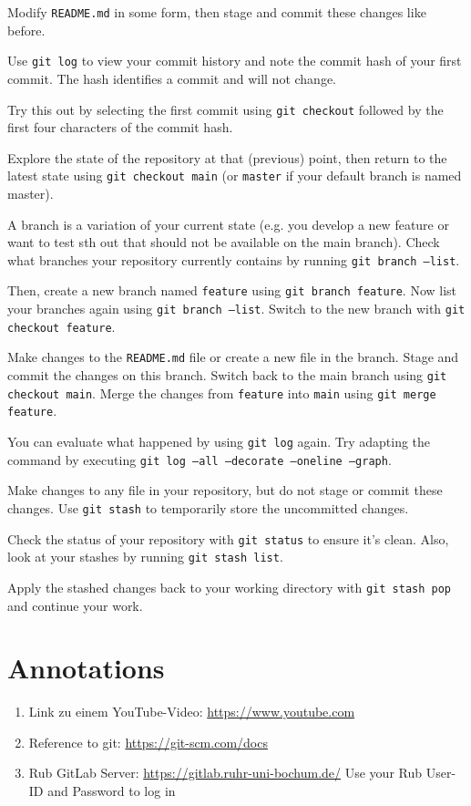 \documentclass{dcbl/challenge}
\begin{document}
\begin{aufgabe}
    Modify \texttt{README.md} in some form, then stage and commit these changes like before.
    
    Use \texttt{git log} to view your commit history and note the commit hash of your first commit. The hash identifies a commit and will not change. 
    
    Try this out by selecting the first commit using \texttt{git checkout} followed by the first four characters of the commit hash.
    
    Explore the state of the repository at that (previous) point, then return to the latest state using \texttt{git checkout main} (or \texttt{master} if your default branch is named master).
    
\end{aufgabe}
\begin{aufgabe}
    A branch is a variation of your current state (e.g. you develop a new feature or want to test sth out that should not be available on the main branch). 
    Check what branches your repository currently contains by running \texttt{git branch --list}.
    
    Then, create a new branch named \texttt{feature} using \texttt{git branch feature}.
    Now list your branches again using \texttt{git branch --list}.
    Switch to the new branch with \texttt{git checkout feature}.
    
    Make changes to the \texttt{README.md} file or create a new file in the branch.
    Stage and commit the changes on this branch.
    Switch back to the main branch using \texttt{git checkout main}.
    Merge the changes from \texttt{feature} into \texttt{main} using \texttt{git merge feature}.

    You can evaluate what happened by using \texttt{git log} again. Try adapting the command by executing \texttt{git log --all --decorate --oneline --graph}.
    
    
\end{aufgabe}
\begin{aufgabe}
    Make changes to any file in your repository, but do not stage or commit these changes.
    Use \texttt{git stash} to temporarily store the uncommitted changes.
    
    Check the status of your repository with \texttt{git status} to ensure it's clean.
    Also, look at your stashes by running \texttt{git stash list}.
    
    Apply the stashed changes back to your working directory with \texttt{git stash pop} and continue your work.
\end{aufgabe}

\section*{Annotations}
\begin{enumerate}
    \item Link zu einem YouTube-Video: \url{https://www.youtube.com}
    \item Reference to git: \url{https://git-scm.com/docs}
    \item Rub GitLab Server: \url{https://gitlab.ruhr-uni-bochum.de/} Use your Rub User-ID and Password to log in
\end{enumerate}
\end{document}

